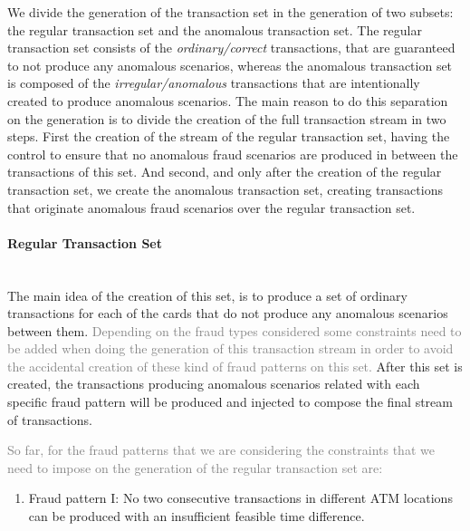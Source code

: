 We divide the generation of the transaction set in the generation of two subsets: the regular transaction set and the anomalous transaction set. The regular transaction set consists of the \emph{ordinary/correct} transactions, that are guaranteed to not produce any anomalous scenarios, whereas the anomalous transaction set is composed of the \emph{irregular/anomalous} transactions that are intentionally created to produce anomalous scenarios. The main reason to do this separation on the generation is to divide the creation of the full transaction stream in two steps. First the creation of the stream of the regular transaction set, having the control to ensure that no anomalous fraud scenarios are produced in between the transactions of this set. And second, and only after the creation of the regular transaction set, we create the anomalous transaction set, creating transactions that originate anomalous fraud scenarios over the regular transaction set.

\paragraph{Regular Transaction Set\\\\}

The main idea of the creation of this set, is to produce a set of ordinary transactions for each of the cards that do not produce any anomalous scenarios between them. \textcolor{gray}{Depending on the fraud types considered some constraints need to be added when doing the generation of this transaction stream in order to avoid the accidental creation of these kind of fraud patterns on this set.} After this set is created, the transactions producing anomalous scenarios related with each specific fraud pattern will be produced and injected to compose the final stream of transactions. 

\textcolor{gray}{So far, for the fraud patterns that we are considering the constraints that we need to impose on the generation of the regular transaction set are:}
\begin{enumerate}
    \renewcommand{\labelenumi}{\Roman{enumi}.} %
    \item Fraud pattern I: No two consecutive transactions in different ATM locations can be produced with an insufficient feasible time difference.
\end{enumerate}

